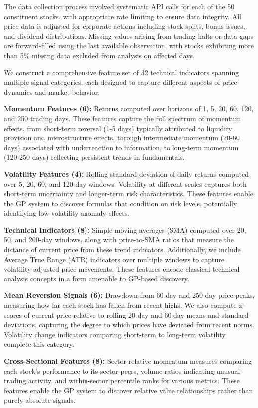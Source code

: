 \documentclass{ieeeaccess}
\begin{document}
The data collection process involved systematic API calls for each of the 50 constituent stocks, with appropriate rate limiting to ensure data integrity. All price data is adjusted for corporate actions including stock splits, bonus issues, and dividend distributions. Missing values arising from trading halts or data gaps are forward-filled using the last available observation, with stocks exhibiting more than 5\% missing data excluded from analysis on affected days.

We construct a comprehensive feature set of 32 technical indicators spanning multiple signal categories, each designed to capture different aspects of price dynamics and market behavior:

\textbf{Momentum Features (6):} Returns computed over horizons of 1, 5, 20, 60, 120, and 250 trading days. These features capture the full spectrum of momentum effects, from short-term reversal (1-5 days) typically attributed to liquidity provision and microstructure effects, through intermediate momentum (20-60 days) associated with underreaction to information, to long-term momentum (120-250 days) reflecting persistent trends in fundamentals.

\textbf{Volatility Features (4):} Rolling standard deviation of daily returns computed over 5, 20, 60, and 120-day windows. Volatility at different scales captures both short-term uncertainty and longer-term risk characteristics. These features enable the GP system to discover formulas that condition on risk levels, potentially identifying low-volatility anomaly effects.

\textbf{Technical Indicators (8):} Simple moving averages (SMA) computed over 20, 50, and 200-day windows, along with price-to-SMA ratios that measure the distance of current price from these trend indicators. Additionally, we include Average True Range (ATR) indicators over multiple windows to capture volatility-adjusted price movements. These features encode classical technical analysis concepts in a form amenable to GP-based discovery.

\textbf{Mean Reversion Signals (6):} Drawdown from 60-day and 250-day price peaks, measuring how far each stock has fallen from recent highs. We also compute z-scores of current price relative to rolling 20-day and 60-day means and standard deviations, capturing the degree to which prices have deviated from recent norms. Volatility change indicators comparing short-term to long-term volatility complete this category.

\textbf{Cross-Sectional Features (8):} Sector-relative momentum measures comparing each stock's performance to its sector peers, volume ratios indicating unusual trading activity, and within-sector percentile ranks for various metrics. These features enable the GP system to discover relative value relationships rather than purely absolute signals.
\end{document}
